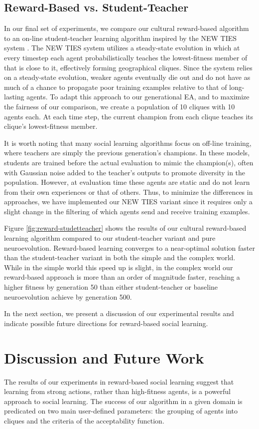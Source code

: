 \documentclass{acm_proc_article-sp}
\begin{document}
\subsection*{Reward-Based vs. Student-Teacher}
In our final set of experiments, we compare our cultural reward-based algorithm to an on-line student-teacher learning algorithm inspired by the NEW TIES system \cite{haasdijk2008social}. The NEW TIES system utilizes a steady-state evolution in which at every timestep each agent probabilistically teaches the lowest-fitness member of that is close to it, effectively forming geographical cliques. Since the system relies on a steady-state evolution, weaker agents eventually die out and do not have as much of a chance to propagate poor training examples relative to that of long-lasting agents. To adapt this approach to our generational EA, and to maximize the fairness of our comparison, we create a population of 10 cliques with 10 agents each. At each time step, the current champion from each clique teaches its clique's lowest-fitness member.

It is worth noting that many social learning algorithms focus on off-line training, where teachers are simply the previous generation's champions. In these models, students are trained before the actual evaluation to mimic the champion(s), often with Gaussian noise added to the teacher's outputs to promote diversity in the population. However, at evaluation time these agents are static and do not learn from their own experiences or that of others. Thus, to minimize the differences in approaches, we have implemented our NEW TIES variant since it requires only a slight change in the filtering of which agents send and receive training examples.

Figure \ref{fig:reward-studetteacher} shows the results of our cultural reward-based learning algorithm compared to our student-teacher variant and pure neuroevolution. Reward-based learning converges to a near-optimal solution faster than the student-teacher variant in both the simple and the complex world. While in the simple world this speed up is slight, in the complex world our reward-based approach is more than an order of magnitude faster, reaching a higher fitness by generation 50 than either student-teacher or baseline neuroevolution achieve by generation 500.

In the next section, we present a discussion of our experimental results and indicate possible future directions for reward-based social learning.

\section{Discussion and Future Work}
\label{sec:future}
The results of our experiments in reward-based social learning suggest that learning from strong actions, rather than high-fitness agents, is a powerful approach to social learning. The success of our algorithm in a given domain is predicated on two main user-defined parameters: the grouping of agents into cliques and the criteria of the acceptability function.
\end{document}
